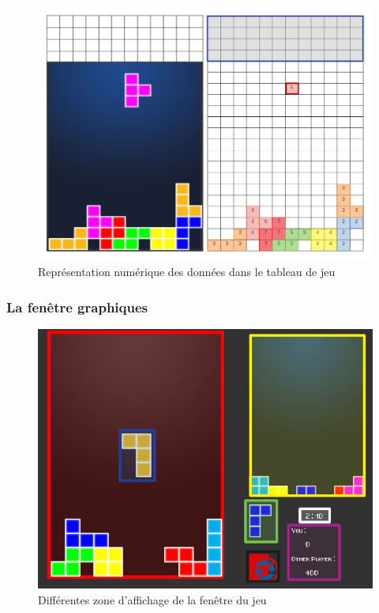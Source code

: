 \documentclass[a4paper, 12pt]{article}
\begin{document}
			\begin{figure}[bt]
				\centering
				\includegraphics[scale=0.35]{img/grid.png}
				\caption{Représentation numérique des données dans le tableau de jeu}
				\label{fig:grid}
			\end{figure}


		\subsubsection{La fenêtre graphiques}

			\begin{figure}[bt]
				\centering
				\includegraphics[scale=0.35]{img/fenetre.png}
				\caption{Différentes zone d'affichage de la fenêtre du jeu}
				\label{fig:fen}
			\end{figure}
\end{document}
